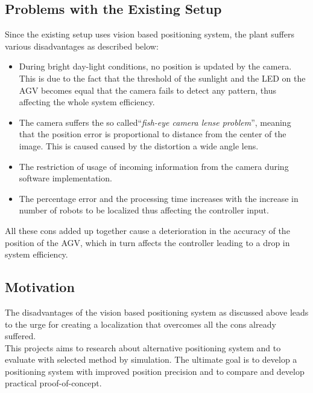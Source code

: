\subsection{Problems with the Existing Setup}

Since the existing setup uses vision based positioning system, the plant suffers various disadvantages as described below:
\begin{itemize}
\item During bright day-light conditions, no position is updated by the camera. This is due to the fact that the threshold of the sunlight and the LED on the AGV becomes equal that the camera fails to detect any pattern, thus affecting the whole system efficiency.
\item The camera suffers the so called``\textit{fish-eye camera lense problem}'', meaning that the position error is proportional to  distance from the center of the image. This is caused caused by the distortion a wide angle lens.
\item The restriction of usage of incoming information from the camera during software implementation.
\item The percentage error and the processing time increases with the increase in number of robots to be localized thus affecting the controller input.
\end{itemize}


All these cons added up together cause a deterioration in the accuracy of the position of the AGV, which in turn affects the controller leading to a drop in system efficiency. 

\subsection{Motivation}

The disadvantages of the vision based positioning system as discussed above leads to the urge for creating a localization that overcomes all the cons already suffered.\\

This projects aims to research about alternative positioning system and to evaluate with selected method by simulation. The ultimate goal is to develop a positioning system with  improved position precision and to compare and develop practical proof-of-concept.

